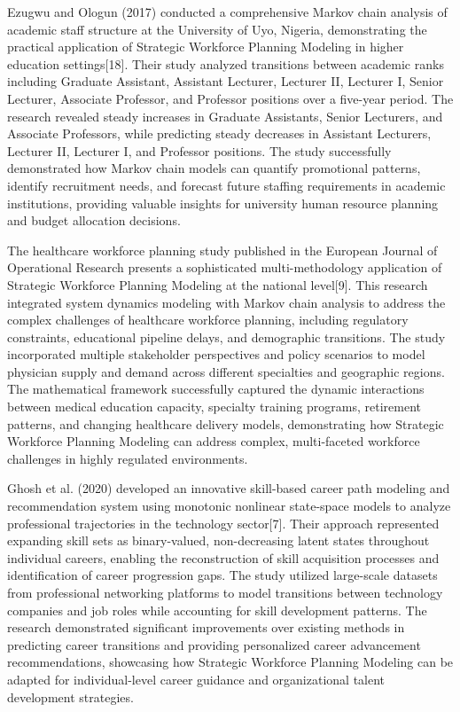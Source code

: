 \documentclass[main.tex]{subfiles}
\begin{document}
Ezugwu and Ologun (2017) conducted a comprehensive Markov chain analysis of academic staff structure at the University of Uyo, Nigeria, demonstrating the practical application of Strategic Workforce Planning Modeling in higher education settings[18]. Their study analyzed transitions between academic ranks including Graduate Assistant, Assistant Lecturer, Lecturer II, Lecturer I, Senior Lecturer, Associate Professor, and Professor positions over a five-year period. The research revealed steady increases in Graduate Assistants, Senior Lecturers, and Associate Professors, while predicting steady decreases in Assistant Lecturers, Lecturer II, Lecturer I, and Professor positions. The study successfully demonstrated how Markov chain models can quantify promotional patterns, identify recruitment needs, and forecast future staffing requirements in academic institutions, providing valuable insights for university human resource planning and budget allocation decisions.

The healthcare workforce planning study published in the European Journal of Operational Research presents a sophisticated multi-methodology application of Strategic Workforce Planning Modeling at the national level[9]. This research integrated system dynamics modeling with Markov chain analysis to address the complex challenges of healthcare workforce planning, including regulatory constraints, educational pipeline delays, and demographic transitions. The study incorporated multiple stakeholder perspectives and policy scenarios to model physician supply and demand across different specialties and geographic regions. The mathematical framework successfully captured the dynamic interactions between medical education capacity, specialty training programs, retirement patterns, and changing healthcare delivery models, demonstrating how Strategic Workforce Planning Modeling can address complex, multi-faceted workforce challenges in highly regulated environments.

Ghosh et al. (2020) developed an innovative skill-based career path modeling and recommendation system using monotonic nonlinear state-space models to analyze professional trajectories in the technology sector[7]. Their approach represented expanding skill sets as binary-valued, non-decreasing latent states throughout individual careers, enabling the reconstruction of skill acquisition processes and identification of career progression gaps. The study utilized large-scale datasets from professional networking platforms to model transitions between technology companies and job roles while accounting for skill development patterns. The research demonstrated significant improvements over existing methods in predicting career transitions and providing personalized career advancement recommendations, showcasing how Strategic Workforce Planning Modeling can be adapted for individual-level career guidance and organizational talent development strategies.
\end{document}

